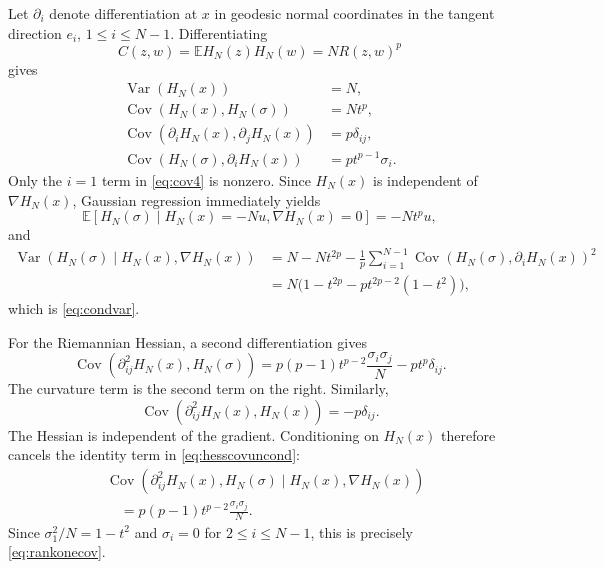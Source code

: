 \documentclass[11pt,reqno]{amsart}
\numberwithin{equation}{section}
\theoremstyle{plain}
\theoremstyle{definition}
\theoremstyle{remark}
\newcommand{\E}{\mathbb E}
\newcommand{\1}{\mathbf 1}
\begin{document}
Let \(\partial_i\) denote differentiation at \(x\) in geodesic normal coordinates in the tangent direction \(e_i\), \(1\leq i\leq N-1\).  Differentiating
\[
 C(z,w)=\E H_N(z)H_N(w)=N R(z,w)^p
\]
gives
\begin{align}
 \operatorname{Var}(H_N(x))&=N,\label{eq:cov1}\\
 \operatorname{Cov}(H_N(x),H_N(\sigma))&=Nt^p,\label{eq:cov2}\\
 \operatorname{Cov}(\partial_iH_N(x),\partial_jH_N(x))&=p\delta_{ij},\label{eq:cov3}\\
 \operatorname{Cov}(H_N(\sigma),\partial_iH_N(x))
 &=p t^{p-1}\sigma_i.\label{eq:cov4}
\end{align}
Only the \(i=1\) term in \eqref{eq:cov4} is nonzero.  Since \(H_N(x)\) is independent of \(\nabla H_N(x)\), Gaussian regression immediately yields
\[
 \E[H_N(\sigma)\mid H_N(x)=-Nu,\nabla H_N(x)=0]
 =-Nt^pu,
\]
and
\begin{align*}
 \operatorname{Var}(H_N(\sigma)\mid H_N(x),\nabla H_N(x))
 &=N-Nt^{2p}-\frac1p\sum_{i=1}^{N-1}
 \operatorname{Cov}(H_N(\sigma),\partial_iH_N(x))^2\\
 &=N\bigl(1-t^{2p}-pt^{2p-2}(1-t^2)\bigr),
\end{align*}
which is \eqref{eq:condvar}.

For the Riemannian Hessian, a second differentiation gives
\begin{equation}\label{eq:hesscovuncond}
 \operatorname{Cov}(\partial_{ij}^2H_N(x),H_N(\sigma))
 =p(p-1)t^{p-2}\frac{\sigma_i\sigma_j}{N}
  -pt^p\delta_{ij}.
\end{equation}
The curvature term is the second term on the right.  Similarly,
\begin{equation}\label{eq:hessvaluecov}
 \operatorname{Cov}(\partial_{ij}^2H_N(x),H_N(x))=-p\delta_{ij}.
\end{equation}
The Hessian is independent of the gradient.  Conditioning on \(H_N(x)\) therefore cancels the identity term in \eqref{eq:hesscovuncond}:
\begin{align*}
 &\operatorname{Cov}(\partial_{ij}^2H_N(x),H_N(\sigma)
 \mid H_N(x),\nabla H_N(x))\\
 &\quad=p(p-1)t^{p-2}\frac{\sigma_i\sigma_j}{N}.
\end{align*}
Since \(\sigma_1^2/N=1-t^2\) and \(\sigma_i=0\) for \(2\leq i\leq N-1\), this is precisely \eqref{eq:rankonecov}.
\end{document}
